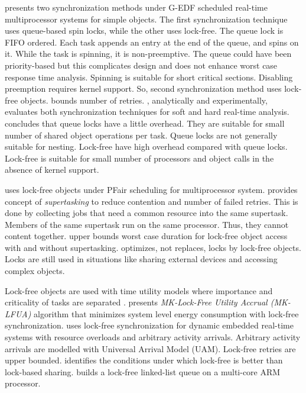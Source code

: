 \documentclass[12pt,english]{report}
\begin{document}
\cite{key-5} presents two synchronization methods under G-EDF scheduled
real-time multiprocessor systems for simple objects. The first synchronization
technique uses queue-based spin locks, while the other uses lock-free.
The queue lock is FIFO ordered. Each task appends an entry at the
end of the queue, and spins on it. While the task is spinning, it
is non-preemptive. The queue could have been priority-based but this
complicates design and does not enhance worst case response time analysis.
Spinning is suitable for short critical sections. Disabling preemption
requires kernel support. So, second synchronization method uses lock-free
objects. \cite{key-5} bounds number of retries. \cite{key-5} , analytically
and experimentally, evaluates both synchronization techniques for
soft and hard real-time analysis. \cite{key-5} concludes that queue
locks have a little overhead. They are suitable for small number of
shared object operations per task. Queue locks are not generally suitable
for nesting. Lock-free have high overhead compared with queue locks.
Lock-free is suitable for small number of processors and object calls
in the absence of kernel support.

\cite{holman2006supporting} uses lock-free objects under PFair scheduling
for multiprocessor system. \cite{holman2006supporting} provides concept
of \textit{supertasking} to reduce contention and number of failed
retries. This is done by collecting jobs that need a common resource
into the same supertask. Members of the same supertask run on the
same processor. Thus, they cannot content together. \cite{holman2006supporting}
upper bounds worst case duration for lock-free object access with
and without supertasking. \cite{holman2006supporting} optimizes,
not replaces, locks by lock-free objects. Locks are still used in
situations like sharing external devices and accessing complex objects.

Lock-free objects are used with time utility models where importance
and criticality of tasks are separated \cite{Lai:2009:SSR:1529282.1529660,1656921}.
\cite{Lai:2009:SSR:1529282.1529660} presents \textit{MK-Lock-Free
Utility Accrual (MK-LFUA)} algorithm that minimizes system level energy
consumption with lock-free synchronization. \cite{1656921} uses lock-free
synchronization for dynamic embedded real-time systems with resource
overloads and arbitrary activity arrivals. Arbitrary activity arrivals
are modelled with Universal Arrival Model (UAM). Lock-free retries
are upper bounded. \cite{1656921} identifies the conditions under
which lock-free is better than lock-based sharing. \cite{5669659}
builds a lock-free linked-list queue on a multi-core ARM processor. 
\end{document}

